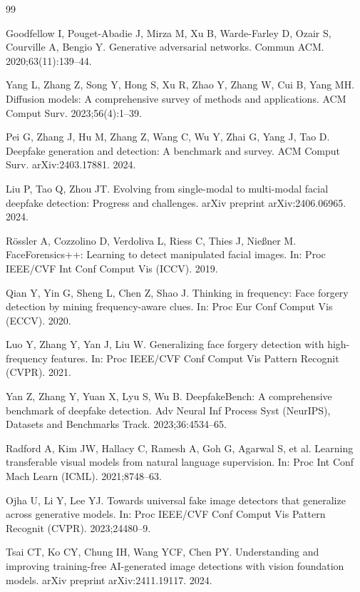 \documentclass[fonts]{icst}
\begin{document}
\begin{thebibliography}{99}
\balance

Goodfellow I, Pouget-Abadie J, Mirza M, Xu B, Warde-Farley D, Ozair S, Courville A, Bengio Y.
Generative adversarial networks.
Commun ACM. 2020;63(11):139--44.

Yang L, Zhang Z, Song Y, Hong S, Xu R, Zhao Y, Zhang W, Cui B, Yang MH.
Diffusion models: A comprehensive survey of methods and applications.
ACM Comput Surv. 2023;56(4):1--39.

Pei G, Zhang J, Hu M, Zhang Z, Wang C, Wu Y, Zhai G, Yang J, Tao D.
Deepfake generation and detection: A benchmark and survey.
ACM Comput Surv. arXiv:2403.17881. 2024.

Liu P, Tao Q, Zhou JT.
Evolving from single-modal to multi-modal facial deepfake detection: Progress and challenges.
arXiv preprint arXiv:2406.06965. 2024.

R{\"o}ssler A, Cozzolino D, Verdoliva L, Riess C, Thies J, Nie{\ss}ner M.
FaceForensics++: Learning to detect manipulated facial images.
In: Proc IEEE/CVF Int Conf Comput Vis (ICCV). 2019.

Qian Y, Yin G, Sheng L, Chen Z, Shao J.
Thinking in frequency: Face forgery detection by mining frequency-aware clues.
In: Proc Eur Conf Comput Vis (ECCV). 2020.

Luo Y, Zhang Y, Yan J, Liu W.
Generalizing face forgery detection with high-frequency features.
In: Proc IEEE/CVF Conf Comput Vis Pattern Recognit (CVPR). 2021.

Yan Z, Zhang Y, Yuan X, Lyu S, Wu B.
DeepfakeBench: A comprehensive benchmark of deepfake detection.
Adv Neural Inf Process Syst (NeurIPS), Datasets and Benchmarks Track. 2023;36:4534--65.

Radford A, Kim JW, Hallacy C, Ramesh A, Goh G, Agarwal S, et al.
Learning transferable visual models from natural language supervision.
In: Proc Int Conf Mach Learn (ICML). 2021;8748--63.

Ojha U, Li Y, Lee YJ.
Towards universal fake image detectors that generalize across generative models.
In: Proc IEEE/CVF Conf Comput Vis Pattern Recognit (CVPR). 2023;24480--9.

Tsai CT, Ko CY, Chung IH, Wang YCF, Chen PY.
Understanding and improving training-free AI-generated image detections with vision foundation models.
arXiv preprint arXiv:2411.19117. 2024.


\end{thebibliography}
\end{document}
